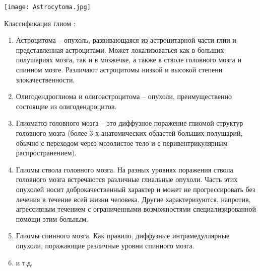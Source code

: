 \begin{minipage}{1.0\linewidth}
    \begin{center}
    
    \texttt{[image: Astrocytoma.jpg]} 
\end{center}
\end{minipage}

Классификация глиом \cite{MedicTherms}:
\begin{enumerate}
    \item Астроцитома – опухоль, развивающаяся из астроцитарной части глии и
    представленная астроцитами. Может локализоваться как в больших полушариях мозга, так
    и в мозжечке, а также в стволе головного мозга и спинном мозге. Различают астроцитомы
    низкой и высокой степени злокачественности.
    \item Олигодендроглиома и олигоастроцитома – опухоли, преимущественно состоящие
    из олигодендроцитов.
    \item Глиоматоз головного мозга – это диффузное поражение глиомой структур головного
    мозга (более 3-х анатомических областей больших полушарий, обычно с переходом через
    мозолистое тело и с перивентрикулярным распространением). 
    \item Глиомы ствола головного мозга. На разных уровнях поражения ствола головного мозга
    встречаются различные глиальные опухоли. Часть этих опухолей носит доброкачественный характер и может не
    прогрессировать без лечения в течение всей жизни человека. Другие характеризуются, напротив, агрессивным течением с
    ограниченными возможностями специализированной помощи этим больным. 
   \item Глиомы спинного мозга. Как правило, диффузные интрамедуллярные опухоли,
    поражающие различные уровни спинного мозга. 
    \item и т.д.
\end{enumerate} 





